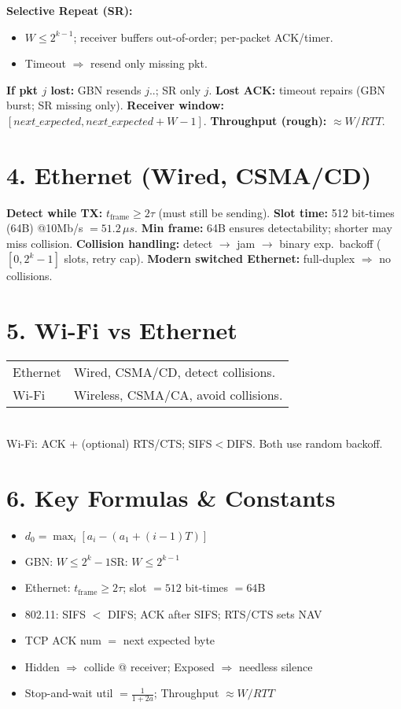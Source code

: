 \documentclass[10pt]{article}
\begin{document}
\begin{multicols*}{2}
\textbf{Selective Repeat (SR):}
\begin{itemize}\itemsep0pt
\item $W\le 2^{k-1}$; receiver buffers out-of-order; per-packet ACK/timer.
\item Timeout $\Rightarrow$ resend only missing pkt.
\end{itemize}

\textbf{If pkt $j$ lost:} GBN resends $j..$;\; SR only $j$.  
\textbf{Lost ACK:} timeout repairs (GBN burst; SR missing only).  
\textbf{Receiver window:} $[next\_expected, next\_expected+W-1]$.  
\textbf{Throughput (rough):} $\approx W/RTT$.

\section*{4. Ethernet (Wired, CSMA/CD)}
\textbf{Detect while TX:}\; $\displaystyle t_{\text{frame}}\ge 2\tau$ (must still be sending).  
\textbf{Slot time:} 512 bit-times (64B) @10Mb/s $=51.2\,\mu s$.  
\textbf{Min frame:} 64B ensures detectability; shorter may miss collision.  
\textbf{Collision handling:} detect $\to$ jam $\to$ binary exp.\ backoff ($[0,2^k\!-\!1]$ slots, retry cap).  
\textbf{Modern switched Ethernet:} full-duplex $\Rightarrow$ no collisions.

\section*{5. Wi-Fi vs Ethernet}
\begin{tabular}{@{}p{1.1cm}p{3.2cm}@{}}
Ethernet & Wired, CSMA/CD, detect collisions.\\
Wi-Fi & Wireless, CSMA/CA, avoid collisions.\\
\end{tabular}\\[2pt]
Wi-Fi: ACK + (optional) RTS/CTS; SIFS$<$DIFS. Both use random backoff.

\section*{6. Key Formulas \& Constants}
\begin{itemize}\itemsep0pt
\item $d_0=\max_i[a_i-(a_1+(i-1)T)]$
\item GBN: $W\le 2^k-1$\quad SR: $W\le 2^{k-1}$
\item Ethernet: $t_{\text{frame}}\ge 2\tau$;\; slot $=512$ bit-times $=64$B
\item 802.11: SIFS $<$ DIFS;\; ACK after SIFS;\; RTS/CTS sets NAV
\item TCP ACK num $=$ next expected byte
\item Hidden $\Rightarrow$ collide @ receiver;\; Exposed $\Rightarrow$ needless silence
\item Stop-and-wait util $=\tfrac{1}{1+2a}$;\; Throughput $\approx W/RTT$
\end{itemize}


\end{multicols*}
\end{document}
